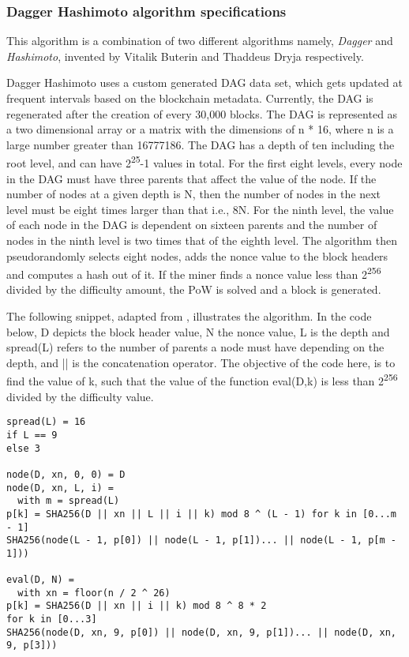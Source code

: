 \documentclass[english]{tktltiki}
\begin{document}
\subsubsection*{Dagger Hashimoto algorithm specifications}

This algorithm is a combination of two different algorithms namely, \textit{Dagger} and \textit{Hashimoto}, invented by Vitalik Buterin and Thaddeus Dryja respectively. 

Dagger Hashimoto uses a custom generated DAG data set, which gets updated at frequent intervals based on the blockchain metadata. Currently, the DAG is regenerated after the creation of every 30,000 blocks. The DAG is represented as a two dimensional array or a matrix with the dimensions of n * 16, where n is a large number greater than 16777186. The DAG has a depth of ten including the root level, and can have 2\textsuperscript{25}-1 values in total. For the first eight levels, every node in the DAG must have three parents that affect the value of the node. If the number of nodes at a given depth is N, then the number of nodes in the next level must be eight times larger than that i.e., 8N. For the ninth level, the value of each node in the DAG is dependent on sixteen parents and the number of nodes in the ninth level is two times that of the eighth level. The algorithm then pseudorandomly selects eight nodes, adds the nonce value to the block headers and computes a hash out of it. If the miner finds a nonce value less than 2\textsuperscript{256} divided by the difficulty amount, the PoW is solved and a block is generated. 

The following snippet, adapted from \cite{dagger}, illustrates the algorithm. In the code below, D depicts the block header value, N the nonce value, L is the depth and spread(L) refers to the number of parents a node must have depending on the depth, and || is the concatenation operator. The objective of the code here, is to find the value of k, such that the value of the function eval(D,k) is less than 2\textsuperscript{256} divided by the difficulty value.

\begin{verbatim}
spread(L) = 16
if L == 9
else 3

node(D, xn, 0, 0) = D
node(D, xn, L, i) =
  with m = spread(L)
p[k] = SHA256(D || xn || L || i || k) mod 8 ^ (L - 1) for k in [0...m - 1]
SHA256(node(L - 1, p[0]) || node(L - 1, p[1])... || node(L - 1, p[m - 1]))

eval(D, N) =
  with xn = floor(n / 2 ^ 26)
p[k] = SHA256(D || xn || i || k) mod 8 ^ 8 * 2
for k in [0...3]
SHA256(node(D, xn, 9, p[0]) || node(D, xn, 9, p[1])... || node(D, xn, 9, p[3]))
\end{verbatim}
\end{document}
